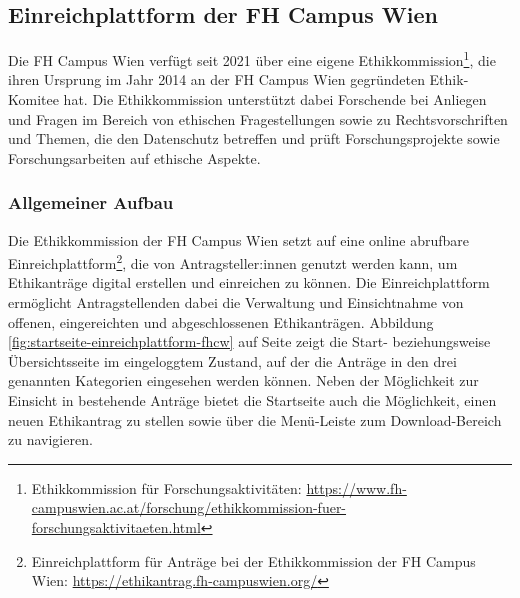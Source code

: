 \documentclass[a4paper,12pt,twoside,numbers=noendperiod]{scrreprt}
\begin{document}
\subsection{Einreichplattform der FH Campus Wien}
\label{sub-sec:einreichplattform-fh-campus-wien}

Die FH Campus Wien verfügt seit 2021 über eine eigene Ethikkommission\footnote{Ethikkommission für Forschungsaktivitäten: \url{https://www.fh-campuswien.ac.at/forschung/ethikkommission-fuer-forschungsaktivitaeten.html}}, die ihren Ursprung im Jahr 2014 an der FH Campus Wien gegründeten Ethik-Komitee hat. Die Ethikkommission unterstützt dabei Forschende bei Anliegen und Fragen im Bereich von ethischen Fragestellungen sowie zu Rechtsvorschriften und Themen, die den Datenschutz betreffen und prüft Forschungsprojekte sowie Forschungsarbeiten auf ethische Aspekte. \cite{fh_campus_wien_ethikkommission_2023}

\subsubsection*{Allgemeiner Aufbau}
\label{sub-sub-sec:fh-cw-allgemeiner-aufbau}

Die Ethikkommission der FH Campus Wien setzt auf eine online abrufbare Einreichplattform\footnote{Einreichplattform für Anträge bei der Ethikkommission der FH Campus Wien: \url{https://ethikantrag.fh-campuswien.org/}}, die von Antragsteller:innen genutzt werden kann, um Ethikanträge digital erstellen und einreichen zu können. \cite{ethikkommission_fh_campus_wien_fh_2023} Die Einreichplattform ermöglicht Antragstellenden dabei die Verwaltung und Einsichtnahme von offenen, eingereichten und abgeschlossenen Ethikanträgen. Abbildung \ref{fig:startseite-einreichplattform-fhcw} auf Seite \pageref{fig:startseite-einreichplattform-fhcw} zeigt die Start- beziehungsweise Übersichtsseite im eingeloggtem Zustand, auf der die Anträge in den drei genannten Kategorien eingesehen werden können. Neben der Möglichkeit zur Einsicht in bestehende Anträge bietet die Startseite auch die Möglichkeit, einen neuen Ethikantrag zu stellen sowie über die Menü-Leiste zum Download-Bereich zu navigieren.
\end{document}
